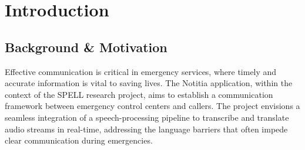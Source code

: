 \chapter{Introduction}

\label{Introduction}


\newcommand{\keyword}[1]{\textbf{#1}}
\newcommand{\tabhead}[1]{\textbf{#1}}
\newcommand{\code}[1]{\texttt{#1}}
\newcommand{\file}[1]{\texttt{\bfseries#1}}
\newcommand{\option}[1]{\texttt{\itshape#1}}


\section{Background \& Motivation}


Effective communication is critical in emergency services, where timely and accurate information is vital to 
saving lives. The Notitia application, within the context of the SPELL research project, aims to establish a 
communication framework between emergency control centers and callers. The project envisions a seamless integration of 
a speech-processing pipeline to transcribe and translate audio streams in real-time, addressing the language barriers 
that often impede clear communication during emergencies.

